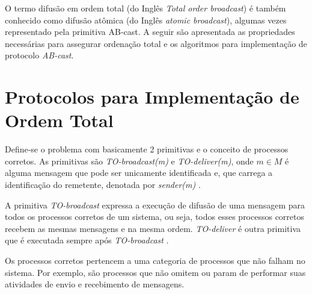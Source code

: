 O termo difusão em ordem total (do Inglês \textit{Total order broadcast}) é também conhecido como difusão atômica (do Inglês \textit{atomic broadcast}), algumas vezes representado pela primitiva \gls{AB-cast}. A seguir são apresentada as propriedades necessárias para assegurar ordenação total e os algoritmos para implementação de protocolo \textit{AB-cast}.



\section{Protocolos para Implementação de Ordem Total}

Define-se o problema com basicamente 2 primitivas e o conceito de processos corretos. As primitivas são \textit{TO-broadcast(m)} e \textit{TO-deliver(m)}, onde $m \in M$ é alguma mensagem que pode ser unicamente identificada e, que carrega a identificação do remetente, denotada por \textit{sender(m)} \cite{PauloVerissimoLuisRodrigues}.

A primitiva \textit{TO-broadcast} expressa a execução de difusão de uma mensagem para todos os processos corretos de um sistema, ou seja, todos esses processos corretos recebem as mesmas mensagens e na mesma ordem. \textit{TO-deliver} é outra primitiva que é executada sempre após \textit{TO-broadcast} \cite{PauloVerissimoLuisRodrigues}.

Os processos corretos pertencem a uma categoria de processos que não falham no sistema. Por exemplo, são processos que não omitem ou param de performar suas atividades de envio e recebimento de mensagens.

